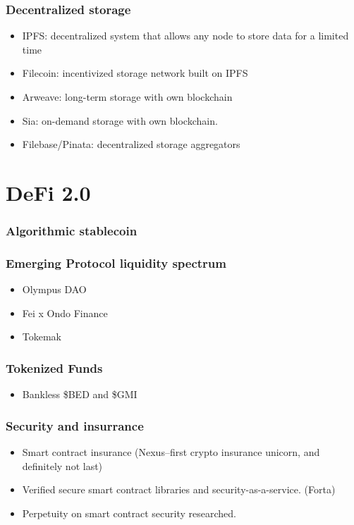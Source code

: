 \documentclass{../notes}
\begin{document}
\section{Decentralized storage}
\begin{itemize}
    \item IPFS: decentralized system that allows any node to store data for a limited time
    \item Filecoin: incentivized storage network built on IPFS
    \item Arweave: long-term storage with own blockchain
    \item Sia: on-demand storage with own blockchain.
    \item Filebase/Pinata: decentralized storage aggregators
\end{itemize}

\part{DeFi 2.0}
\section{Algorithmic stablecoin}


\section{Emerging Protocol liquidity spectrum}
\begin{itemize}
    \item Olympus DAO
    \item Fei x Ondo Finance
    \item Tokemak
\end{itemize}


\section{Tokenized Funds}
\begin{itemize}
    \item Bankless \$BED and \$GMI
\end{itemize}


\section{Security and insurrance}
\begin{itemize}
    \item Smart contract insurance (Nexus--first crypto insurance unicorn, and definitely not last)
    \item Verified secure smart contract libraries and security-as-a-service. (Forta)
    \item Perpetuity on smart contract security researched. 
\end{itemize}
\end{document}

